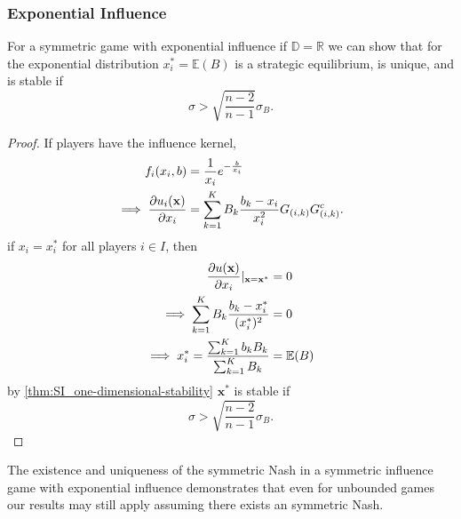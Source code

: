 \documentclass{article}
\newcommand {\R}{\mathbb{R}}
\begin{document}
            \subsubsection{Exponential Influence}
                For a symmetric game with exponential influence if $\mathbb{D}=\R$ we can show that for the exponential distribution $x_i^{*}=\mathbb{E}(B)$ is a strategic equilibrium, is unique, and is stable if
                \begin{equation}
                    \sigma>\sqrt{\frac{n-2}{n-1}}\sigma_B.
                \end{equation}   
                \begin{proof}
                    If players have the influence kernel,
                    \begin{align}
                        f_i(x_i,b)&=\frac{1}{x_i}e^{-\frac{b}{x_i}} \\ %
                        \implies \pdv{u_i(\mathbf{x})}{x_{i}}&=\sum_{k=1}^{K}B_{k}\frac{b_{k}-x_i}{x_i^2}G_{(i,k)}G_{(i,k)}^c.
                    \end{align}
                    if $x_{i}=x^*_i$ for all players $i\in I$, then 
                    \begin{align}
                        \pdv{u(\mathbf{x})}{x_{i}}|_{\mathbf{x}=\mathbf{x}^*}&=0 \\ %
                        \implies \sum_{k=1}^{K}B_{k}\frac{b_{k}-x_i^*}{(x_i^*)^2}&=0 \\ %
                        \implies x_i^*= \frac{\sum_{k=1}^{K}b_kB_k}{\sum_{k=1}^{K}B_k}&=\mathbb{E}(B)
                    \end{align}
                    by \cref{thm:SI_one-dimensional-stability} $\mathbf{x}^*$ is stable if                    \begin{equation}
                        \sigma>\sqrt{\frac{n-2}{n-1}}\sigma_B.
                    \end{equation}
                \end{proof}
                The existence and uniqueness of the symmetric Nash in a symmetric influence game with exponential influence demonstrates that even for unbounded games our results may still apply assuming there exists an symmetric Nash. 
\end{document}
